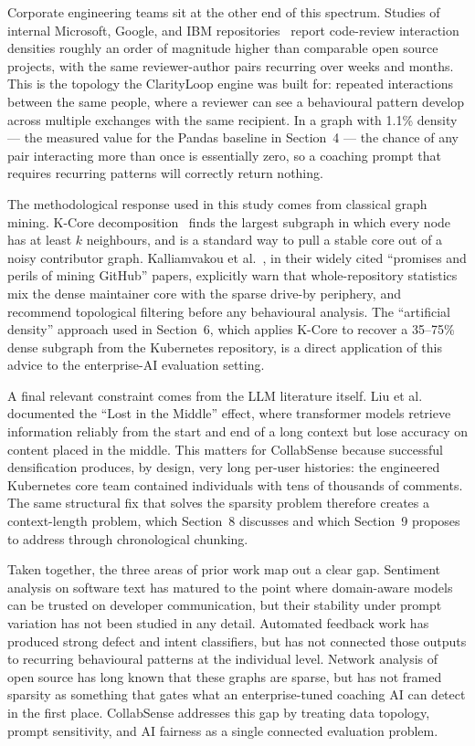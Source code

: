 \documentclass[conference]{IEEEconf}
\begin{document}
Corporate engineering teams sit at the other end of this spectrum. Studies of internal Microsoft, Google, and IBM repositories~\cite{bird2011dont,sadowski2018modern} report code-review interaction densities roughly an order of magnitude higher than comparable open source projects, with the same reviewer-author pairs recurring over weeks and months. This is the topology the ClarityLoop engine was built for: repeated interactions between the same people, where a reviewer can see a behavioural pattern develop across multiple exchanges with the same recipient. In a graph with 1.1\% density --- the measured value for the Pandas baseline in Section~4 --- the chance of any pair interacting more than once is essentially zero, so a coaching prompt that requires recurring patterns will correctly return nothing.

The methodological response used in this study comes from classical graph mining. K-Core decomposition~\cite{seidman1983network,batagelj2011fast} finds the largest subgraph in which every node has at least $k$ neighbours, and is a standard way to pull a stable core out of a noisy contributor graph. Kalliamvakou et al.~\cite{kalliamvakou2014promises,kalliamvakou2016indepth}, in their widely cited ``promises and perils of mining GitHub'' papers, explicitly warn that whole-repository statistics mix the dense maintainer core with the sparse drive-by periphery, and recommend topological filtering before any behavioural analysis. The ``artificial density'' approach used in Section~6, which applies K-Core to recover a 35--75\% dense subgraph from the Kubernetes repository, is a direct application of this advice to the enterprise-AI evaluation setting.

A final relevant constraint comes from the LLM literature itself. Liu et al.~\cite{liu2024lost} documented the ``Lost in the Middle'' effect, where transformer models retrieve information reliably from the start and end of a long context but lose accuracy on content placed in the middle. This matters for CollabSense because successful densification produces, by design, very long per-user histories: the engineered Kubernetes core team contained individuals with tens of thousands of comments. The same structural fix that solves the sparsity problem therefore creates a context-length problem, which Section~8 discusses and which Section~9 proposes to address through chronological chunking.

Taken together, the three areas of prior work map out a clear gap. Sentiment analysis on software text has matured to the point where domain-aware models can be trusted on developer communication, but their stability under prompt variation has not been studied in any detail. Automated feedback work has produced strong defect and intent classifiers, but has not connected those outputs to recurring behavioural patterns at the individual level. Network analysis of open source has long known that these graphs are sparse, but has not framed sparsity as something that gates what an enterprise-tuned coaching AI can detect in the first place. CollabSense addresses this gap by treating data topology, prompt sensitivity, and AI fairness as a single connected evaluation problem.
\end{document}
